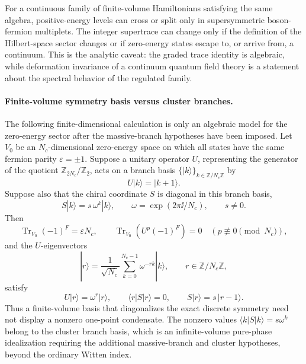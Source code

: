 For a continuous family of finite-volume Hamiltonians satisfying the same
algebra, positive-energy levels can cross or split only in supersymmetric
boson-fermion multiplets.  The integer supertrace can change only if the
definition of the Hilbert-space sector changes or if zero-energy states
escape to, or arrive from, a continuum.  This is the analytic caveat: the
graded trace identity is algebraic, while deformation invariance of a
continuum quantum field theory is a statement about the spectral behavior of
the regulated family.

\paragraph{Finite-volume symmetry basis versus cluster branches.}
The following finite-dimensional calculation is only an algebraic model for the
zero-energy sector after the massive-branch hypotheses have been imposed.
Let \(V_0\) be an \(N_c\)-dimensional zero-energy space on which all states
have the same fermion parity \(\varepsilon=\pm1\).  Suppose a unitary
operator \(U\), representing the generator of the quotient
\(\mathbb Z_{2N_c}/\mathbb Z_2\), acts on a branch basis
\(\{|k\rangle\}_{k\in\mathbb Z/N_c\mathbb Z}\) by
\[
  U|k\rangle=|k+1\rangle .
\]
Suppose also that the chiral coordinate \(S\) is diagonal in this branch
basis,
\[
  S|k\rangle=s\,\omega^k|k\rangle,
  \qquad
  \omega=\exp(2\pi\ii/N_c),
  \qquad s\neq0 .
\]
Then
\begin{equation}
  \operatorname{Tr}_{V_0}(-1)^F=\varepsilon N_c,
  \qquad
  \operatorname{Tr}_{V_0}\!\left(U^p(-1)^F\right)=0
  \quad (p\not\equiv0\!\!\pmod {N_c}),
  \label{eq:pure-sym-twined-index-regular-representation}
\end{equation}
and the \(U\)-eigenvectors
\[
  |r\rangle
  =
  \frac{1}{\sqrt{N_c}}
  \sum_{k=0}^{N_c-1}\omega^{-rk}|k\rangle,
  \qquad r\in\mathbb Z/N_c\mathbb Z ,
\]
satisfy
\begin{equation}
  U|r\rangle=\omega^r|r\rangle,
  \qquad
  \langle r|S|r\rangle=0,
  \qquad
  S|r\rangle=s\,|r-1\rangle .
  \label{eq:pure-sym-finite-volume-symmetry-basis}
\end{equation}
Thus a finite-volume basis that diagonalizes the exact discrete symmetry
need not display a nonzero one-point condensate.  The nonzero values
\(\langle k|S|k\rangle=s\omega^k\) belong to the cluster branch basis, which
is an infinite-volume pure-phase idealization requiring the additional
massive-branch and cluster hypotheses, beyond the ordinary Witten index.

